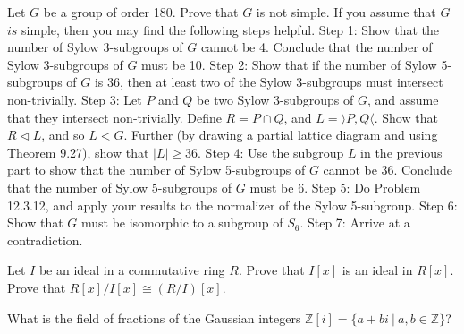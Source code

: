 \documentclass[12pt,letterpaper,boxed]{hmcpset}
\begin{document}


\begin{problem}[12.3.23]
Let $G$ be a group of order 180. Prove that $G$ is not simple.
\newline If you assume that $G$ $\textit{is}$ simple, then you may find the following steps helpful.
\newline
Step 1: Show that the number of Sylow 3-subgroups of $G$ cannot be 4.  Conclude that the number of Sylow 3-subgroups of $G$ must be 10.
\newline
Step 2: Show that if the number of Sylow 5-subgroups of $G$ is 36, then at least two  of the Sylow 3-subgroups must intersect non-trivially.
\newline
Step 3: Let $P$ and $Q$ be two Sylow 3-subgroups of $G$, and assume that they intersect non-trivially. Define $R = P \cap Q$, and $L = \rangle P,Q \langle$. Show that $R \triangleleft L$, and so $L < G$. Further (by drawing a partial lattice diagram and using Theorem 9.27), show that $\vert L \vert \geq 36$.
\newline
Step 4: Use the subgroup $L$ in the previous part to show that the number of Sylow 5-subgroups of $G$ cannot be 36. Conclude that the number of Sylow 5-subgroups of $G$ must be 6.
\newline
Step 5: Do Problem 12.3.12, and apply your results to the normalizer of the Sylow 5-subgroup.
\newline
Step 6: Show that $G$ must be isomorphic to a subgroup of $S_6$.
\newline
Step 7: Arrive at a contradiction.
\end{problem}

\begin{solution}
\end{solution}

\clearpage

\begin{problem}[16.2.12]
Let $I$ be an ideal in a commutative ring $R$. Prove that $I[x]$ is an ideal in $R[x]$. Prove that $R[x]/I[x] \cong (R/I)[x]$.
\end{problem}

\begin{solution}
\end{solution}

\clearpage

\begin{problem}[17.1.1]
What is the field of fractions of the Gaussian integers $\mathbb{Z}[i] = \{ a + bi \ \vert \ a,b \in \mathbb{Z} \}$?
\end{problem}
\end{document}
